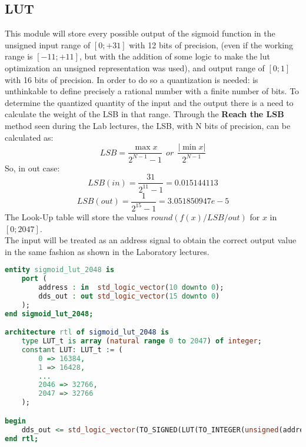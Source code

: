 \subsection{LUT}
This module will store every possible output of the sigmoid function in the unsigned input range of $[0; +31]$ with 12 bits of precision, (even if the working range is $[-11; +11]$, but with the addition of some logic to make the lut optimization an unsigned representation was used), and output range of $[0; 1]$ with 16 bits of precision. In order to do so a quantization is needed: is unthinkable to define precisely a rational number with a finite number of bits. To determine the quantized quantity of the input and the output there is a need to calculate the weight of the LSB in that range. Through the \textbf{Reach the LSB} method seen during the Lab lectures, the LSB, with N bits of precision, can be calculated as:
\begin{equation}
LSB = \frac{\max{x}}{2^{N-1}-1}\ \ or\ \ \frac{|\min{x}|}{2^{N-1}}
\end{equation}
So, in out case:
\begin{equation}
LSB(in) = \frac{31}{2^{11} - 1} = 0.015144113
\end{equation}
\begin{equation}
LSB(out) = \frac{1}{2^{15} -1} = 3.051850947e-5
\end{equation}
The Look-Up table will store the values $round(f(x)/LSB/out)$ for $x$ in $[0; 2047]$.\\
The input will be treated as an address signal to obtain the correct output value in the same fashion as shown in the Laboratory lectures.
\begin{lstlisting}[language=VHDL]
entity sigmoid_lut_2048 is
	port (
		address : in  std_logic_vector(10 downto 0);
		dds_out : out std_logic_vector(15 downto 0) 
	);
end sigmoid_lut_2048;

architecture rtl of sigmoid_lut_2048 is
	type LUT_t is array (natural range 0 to 2047) of integer;
	constant LUT: LUT_t := (
		0 => 16384,
		1 => 16428,
		...
		2046 => 32766,
		2047 => 32766
	);

begin
	dds_out <= std_logic_vector(TO_SIGNED(LUT(TO_INTEGER(unsigned(address))),16));
end rtl;	
\end{lstlisting}

